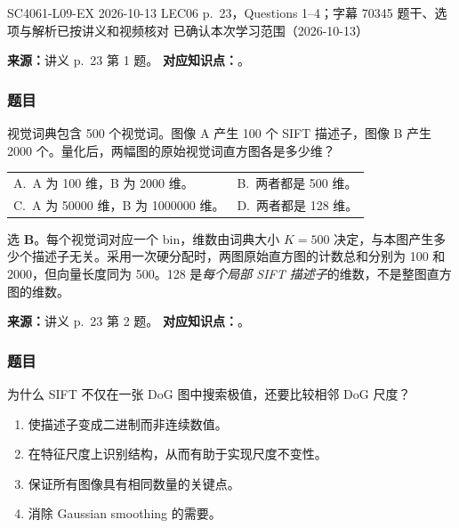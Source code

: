 

\examplemeta
  {SC4061-L09-EX}
  {2026-10-13}
  {LEC06 p.~23，Questions 1--4；字幕 70345}
  {题干、选项与解析已按讲义和视频核对}
  {已确认本次学习范围（2026-10-13）}

\nopagebreak[4]

\textbf{来源：}讲义 p.~23 第 1 题。
\textbf{对应知识点：}。

\subsubsection*{题目}

视觉词典包含 500 个视觉词。图像 A 产生 100 个 SIFT 描述子，图像 B 产生 2000 个。量化后，两幅图的原始视觉词直方图各是多少维？
\begin{center}
\begin{tabularx}{\linewidth}{@{}XX@{}}
  A.~A 为 100 维，B 为 2000 维。 & B.~两者都是 500 维。\\
  C.~A 为 50000 维，B 为 1000000 维。 & D.~两者都是 128 维。
\end{tabularx}
\end{center}

\begin{checkedsolution}
选 \textbf{B}。每个视觉词对应一个 bin，维数由词典大小 $K=500$ 决定，与本图产生多少个描述子无关。采用一次硬分配时，两图原始直方图的计数总和分别为 100 和 2000，但向量长度同为 500。128 是\emph{每个局部 SIFT 描述子}的维数，不是整图直方图的维数。
\end{checkedsolution}

\nopagebreak[4]

\textbf{来源：}讲义 p.~23 第 2 题。
\textbf{对应知识点：}。

\subsubsection*{题目}

为什么 SIFT 不仅在一张 DoG 图中搜索极值，还要比较相邻 DoG 尺度？
\begin{enumerate}[label=\Alph*.,nosep]
  \item 使描述子变成二进制而非连续数值。
  \item 在特征尺度上识别结构，从而有助于实现尺度不变性。
  \item 保证所有图像具有相同数量的关键点。
  \item 消除 Gaussian smoothing 的需要。
\end{enumerate}

